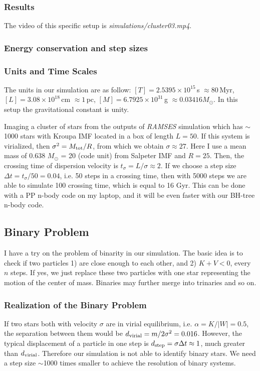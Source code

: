 \subsubsection*{Results}
The video of this specific setup is \textit{simulations/cluster03.mp4}.

\subsubsection*{Energy conservation and step sizes}

\subsubsection*{Units and Time Scales}
The units in our simulation are as follow: $ [T] = 2.5395 \times 10^{15}\,$s $\approx 
80\,$Myr, 
$ [L] = 3.08 \times 10^{18} \, $cm $ \approx 1 \, $pc, $ [M] = 6.7925 \times 10^{31} \, $g $ 
\approx 0.03416 M_\odot $. In this setup the gravitational constant is unity. 

Imaging a cluster of stars from the outputs of \textit{RAMSES} simulation which has $ \sim 
$ 1000 stars with Kroupa IMF located in a box of length $ L = 50 $. If this system is 
virialized, then $ \sigma^2 = M_{\rm tot} / R $, from which we obtain $ \sigma \approx 
27 $. Here I use a mean mass of 0.638 $ M_\odot $ = 20 (code unit) from Salpeter IMF and 
$ R = 25 $.
Then, the crossing time of dispersion velocity is $ t_{\sigma} = L / \sigma \approx 2 $.
If we choose a step size $ \Delta t  = t_\sigma / 50 = 0.04 $, i.e. 50 steps in a crossing time, 
then with 5000 steps we are able to simulate 100 crossing time, which is equal to 16 Gyr. 
This can be done with a PP n-body code on my laptop, and it will be even faster with our 
BH-tree n-body code.

\subsection*{Binary Problem}
I have a try on the problem of binarity in our simulation.
The basic idea is to check if two particles 1) are close enough to each other, and 2) $ K + V 
< 0 $, every $ n $ steps. If yes, we just replace these two particles with one star 
representing the motion of the center of mass. Binaries may further merge into trinaries 
and so on.


\subsubsection*{Realization of the Binary Problem}
If two stars both with velocity $ \sigma $ are in virial equilibrium, i.e. $ \alpha = K/|W| = 0.5 
$, the separation between them would be $ d_{\rm virial} = m /2 \sigma^2 = 0.016 $. 
However, the typical displacement of a particle in one step is $ d_{\rm step} = \sigma \Delta 
t \approx 1 $, much greater than $ d_{\rm virial} $. Therefore our simulation is not able to 
identify binary stars. We need a step size $ \sim $1000 times smaller to achieve the 
resolution of binary systems.

